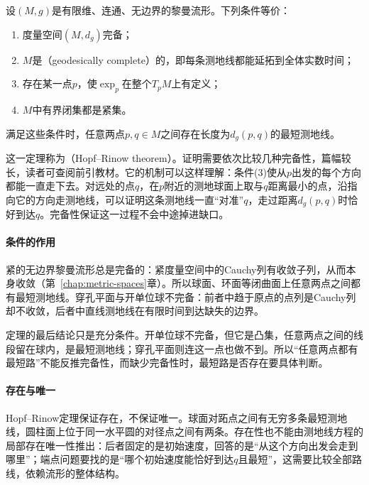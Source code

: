 \begin{theorem}
\label{thm:riem-hopf-rinow}
设$(M,g)$是有限维、连通、无边界的黎曼流形。下列条件等价：
\begin{enumerate}
\item 度量空间$(M,d_g)$完备；
\item $M$是（geodesically complete）的，即每条测地线都能延拓到全体实数时间；
\item 存在某一点$p$，使$\exp_p$在整个$T_pM$上有定义；
\item $M$中有界闭集都是紧集。
\end{enumerate}
满足这些条件时，任意两点$p,q\in M$之间存在长度为$d_g(p,q)$的最短测地线。
\end{theorem}

这一定理称为（Hopf--Rinow theorem）。证明需要依次比较几种完备性，篇幅较长，读者可查阅前引教材。它的机制可以这样理解：条件(3)使从$p$出发的每个方向都能一直走下去。对远处的点$q$，在$p$附近的测地球面上取与$q$距离最小的点，沿指向它的方向走测地线，可以证明这条测地线一直“对准”$q$，走过距离$d_g(p,q)$时恰好到达$q$。完备性保证这一过程不会中途掉进缺口。

\paragraph{条件的作用}
紧的无边界黎曼流形总是完备的：紧度量空间中的Cauchy列有收敛子列，从而本身收敛（第~\ref{chap:metric-spaces}章）。所以球面、环面等闭曲面上任意两点之间都有最短测地线。穿孔平面与开单位球不完备：前者中趋于原点的点列是Cauchy列却不收敛，后者中直线测地线在有限时间到达缺失的边界。

定理的最后结论只是充分条件。开单位球不完备，但它是凸集，任意两点之间的线段留在球内，是最短测地线；穿孔平面则连这一点也做不到。所以“任意两点都有最短路”不能反推完备性，而缺少完备性时，最短路是否存在要具体判断。

\paragraph{存在与唯一}
Hopf--Rinow定理保证存在，不保证唯一。球面对跖点之间有无穷多条最短测地线，圆柱面上位于同一水平圆的对径点之间有两条。存在性也不能由测地线方程的局部存在唯一性推出：后者固定的是初始速度，回答的是“从这个方向出发会走到哪里”；端点问题要找的是“哪个初始速度能恰好到达$q$且最短”，这需要比较全部路线，依赖流形的整体结构。
